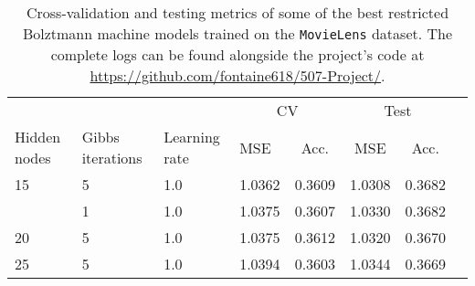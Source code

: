 \begin{table}
\centering
\begin{tabular}{llllcccc}
\toprule
     &     &      & \multicolumn{2}{c}{CV} & \multicolumn{2}{c}{Test}\\
     \cmidrule(lr){4-5}\cmidrule(lr){6-7}
Hidden nodes & Gibbs iterations  & Learning rate &    MSE & Acc. & MSE & Acc.  \\
\midrule
15 & 5 & 1.0 &   1.0362 &      0.3609 &   1.0308 &        0.3682 \\
   & 1 & 1.0 &   1.0375 &      0.3607 &   1.0330 &        0.3682 \\
20 & 5 & 1.0 &   1.0375 &      0.3612 &   1.0320 &        0.3670 \\
25 & 5 & 1.0 &   1.0394 &      0.3603 &   1.0344 &        0.3669 \\
\bottomrule
\end{tabular}
\caption{Cross-validation and testing metrics of some of the best restricted Bolztmann machine models trained on the \texttt{MovieLens} dataset. The complete logs can be found alongside the project's code at \url{https://github.com/fontaine618/507-Project/}.}
\label{tab:results.rbm}
\end{table}
